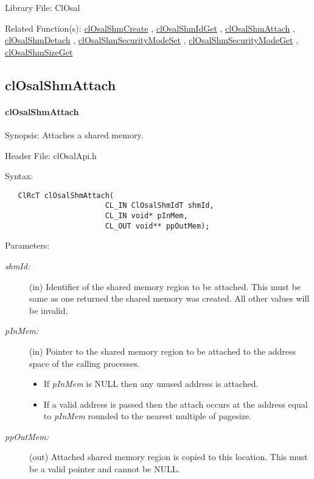 \begin{Desc}
\item[Library File:]Cl\-Osal\end{Desc}
\begin{Desc}
\item[Related Function(s):]\hyperlink{pageosal145}{cl\-Osal\-Shm\-Create} , \hyperlink{pageosal146}{cl\-Osal\-Shm\-Id\-Get} , 
\hyperlink{pageosal148}{cl\-Osal\-Shm\-Attach} , \hyperlink{pageosal149}{cl\-Osal\-Shm\-Detach} , 
\hyperlink{pageosal150}{cl\-Osal\-Shm\-Security\-Mode\-Set} , \hyperlink{pageosal151}{cl\-Osal\-Shm\-Security\-Mode\-Get} , 
\hyperlink{pageosal152}{cl\-Osal\-Shm\-Size\-Get} \end{Desc}

\newpage
\subsection{clOsalShmAttach}
\hypertarget{pageosal148}{}\paragraph{cl\-Osal\-Shm\-Attach}\label{pageosal148}
\begin{Desc}
\item[Synopsis:]Attaches a shared memory.\end{Desc}
\begin{Desc}
\item[Header File:]clOsalApi.h\end{Desc}
\begin{Desc}
\item[Syntax:]

\footnotesize\begin{verbatim}   ClRcT clOsalShmAttach(
                       CL_IN ClOsalShmIdT shmId,
                       CL_IN void* pInMem,
                       CL_OUT void** ppOutMem);
\end{verbatim}
\normalsize
\end{Desc}
\begin{Desc}
\item[Parameters:]
\begin{description}
\item[{\em shm\-Id:}](in) Identifier of the shared memory region to be attached. This must be same as one returned the shared memory was created.
All other values will be invalid.\item[{\em p\-In\-Mem:}](in) Pointer to the shared memory region to be attached to the address space of the calling processes. \begin{itemize}
\item If {\em p\-In\-Mem\/} is NULL then any unused address is attached. \item If a valid address is passed then the attach occurs at the address equal to {\em p\-In\-Mem\/} rounded to the nearest multiple of pagesize.\end{itemize}
\item[{\em pp\-Out\-Mem:}](out) Attached shared memory region is copied to this location. This must be a valid pointer and cannot be NULL.\end{description}
\end{Desc}
